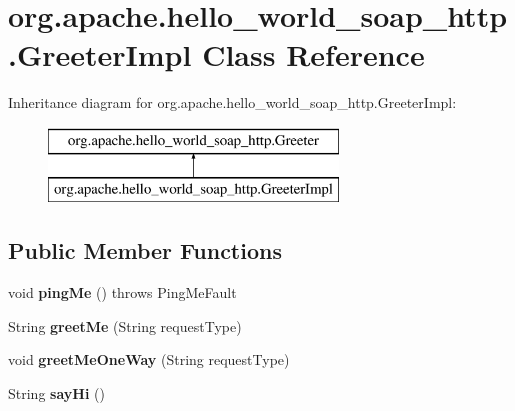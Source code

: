 \hypertarget{classorg_1_1apache_1_1hello__world__soap__http_1_1_greeter_impl}{}\section{org.\+apache.\+hello\+\_\+world\+\_\+soap\+\_\+http.\+Greeter\+Impl Class Reference}
\label{classorg_1_1apache_1_1hello__world__soap__http_1_1_greeter_impl}
Inheritance diagram for org.\+apache.\+hello\+\_\+world\+\_\+soap\+\_\+http.\+Greeter\+Impl\+:\begin{figure}[H]
\begin{center}
\leavevmode
\includegraphics[height=2.000000cm]{classorg_1_1apache_1_1hello__world__soap__http_1_1_greeter_impl}
\end{center}
\end{figure}
\subsection*{Public Member Functions}
\begin{DoxyCompactItemize}
\item 
\hypertarget{classorg_1_1apache_1_1hello__world__soap__http_1_1_greeter_impl_a97dbe467ad2fbb3cbb0bcc611e39b3ef}{}void {\bfseries ping\+Me} ()  throws Ping\+Me\+Fault    \label{classorg_1_1apache_1_1hello__world__soap__http_1_1_greeter_impl_a97dbe467ad2fbb3cbb0bcc611e39b3ef}

\item 
\hypertarget{classorg_1_1apache_1_1hello__world__soap__http_1_1_greeter_impl_a1c87458a42fd69efed52df9ff6165b25}{}String {\bfseries greet\+Me} (String request\+Type)\label{classorg_1_1apache_1_1hello__world__soap__http_1_1_greeter_impl_a1c87458a42fd69efed52df9ff6165b25}

\item 
\hypertarget{classorg_1_1apache_1_1hello__world__soap__http_1_1_greeter_impl_ae1c346024c1276151eb8d3963d4586b5}{}void {\bfseries greet\+Me\+One\+Way} (String request\+Type)\label{classorg_1_1apache_1_1hello__world__soap__http_1_1_greeter_impl_ae1c346024c1276151eb8d3963d4586b5}

\item 
\hypertarget{classorg_1_1apache_1_1hello__world__soap__http_1_1_greeter_impl_a981859b523361798433715141e57f460}{}String {\bfseries say\+Hi} ()\label{classorg_1_1apache_1_1hello__world__soap__http_1_1_greeter_impl_a981859b523361798433715141e57f460}

\end{DoxyCompactItemize}


